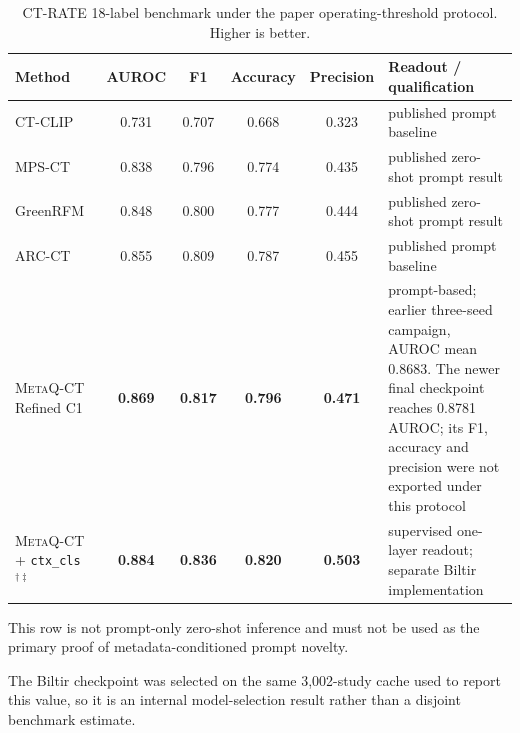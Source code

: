 \documentclass[10pt,twocolumn]{article}
\newcommand{\ours}{\textsc{MetaQ-CT}}
\newcommand{\best}[1]{\textbf{#1}}
\begin{document}
\begin{table}[t]
\centering
\begin{threeparttable}
\caption{CT-RATE 18-label benchmark under the paper operating-threshold
protocol. Higher is better.}
\label{tab:adultbench}
\begin{tabular}{@{}lccccp{4.5cm}@{}}
\toprule
Method & AUROC & F1 & Accuracy & Precision & Readout / qualification \\
\midrule
CT-CLIP~\cite{hamamci2024ctclip} & 0.731 & 0.707 & 0.668 & 0.323 & published prompt baseline \\
MPS-CT~\cite{li2025mpsct} & 0.838 & 0.796 & 0.774 & 0.435 & published zero-shot prompt result \\
GreenRFM~\cite{li2026greenrfm} & 0.848 & 0.800 & 0.777 & 0.444 & published zero-shot prompt result \\
ARC-CT~\cite{isik2026arcct} & 0.855 & 0.809 & 0.787 & 0.455 & published prompt baseline \\
\ours{} Refined C1 & \best{0.869} & \best{0.817} & \best{0.796} & \best{0.471} & prompt-based; earlier three-seed campaign, AUROC mean 0.8683. The newer final checkpoint reaches 0.8781 AUROC; its F1, accuracy and precision were not exported under this protocol \\
\ours{} + \texttt{ctx\_cls}$^{\dagger\ddagger}$ & \best{0.884} & \best{0.836} & \best{0.820} & \best{0.503} & supervised one-layer readout; separate Biltir implementation \\
\bottomrule
\end{tabular}
\begin{tablenotes}[flushleft]\footnotesize
\item[$\dagger$] This row is not prompt-only zero-shot inference and must not
be used as the primary proof of metadata-conditioned prompt novelty.
\item[$\ddagger$] The Biltir checkpoint was selected on the same 3,002-study
cache used to report this value, so it is an internal model-selection result
rather than a disjoint benchmark estimate.
\end{tablenotes}
\end{threeparttable}
\end{table}
\end{document}
